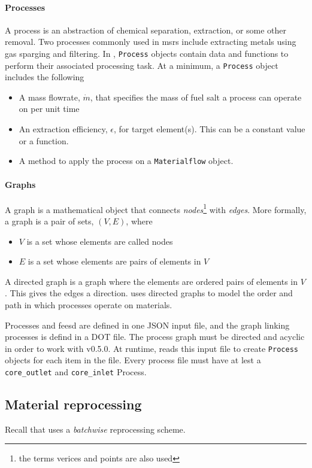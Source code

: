 \paragraph{Processes}
    A process is an abstraction of chemical separation, extraction, or some
    other removal. Two processes commonly used in \Gls{msr}s include
    extracting metals using gas sparging and filtering. In \SaltProc,
    \verb.Process. objects contain data and functions to perform their
    associated processing task. At a minimum, a \verb.Process. object includes
    the following
    \begin{itemize}
        \item A mass flowrate, $\dot{m}$, that specifies the mass of fuel salt a process can operate on per unit time
        \item An extraction efficiency, $\epsilon$, for target element(s). This can be a constant value or a function.
        \item A method to apply the process on a \verb.Materialflow. object. 
    \end{itemize}

\paragraph{Graphs}
    A graph is a mathematical object that connects {\it nodes}\footnote{the
    terms verices and points are also used} with {\it edges}. More formally,
    a graph is a pair of sets, $(V, E)$, where
    \begin{itemize}
        \item $V$ is a set whose elements are called nodes
        \item $E$ is a set whose elements are pairs of elements in $V$
    \end{itemize}
    A directed graph is a graph where the elements are ordered pairs of elements
    in $V$. This gives the edges a direction. \SaltProc uses directed graphs to
    model the order and path in which processes operate on materials.
        
Processes and feesd are defined in one JSON input file, and the graph linking
processes is  defind in a DOT file. The process graph must be directed and
acyclic in order to work with \SaltProc v0.5.0. At runtime, \SaltProc reads this
input file to create \verb.Process. objects for each item in the file. Every
process file must have at lest a \verb.core_outlet. and \verb.core_inlet.
Process.

\subsection{Material reprocessing}
Recall that \SaltProc uses a {\it batchwise} reprocessing scheme.


